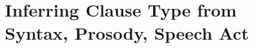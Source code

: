 \documentclass[../main.tex]{subfiles}
\begin{document}
\section{Inferring Clause Type from Syntax, Prosody, Speech Act}

\begin{comment}
\begin{minipage}[t]{0.5\linewidth}
\begin{figure}[H]
\begin{center}
\begin{tikzpicture}
\node[obs] (a) {$A_{i}$};
\node[latent, below=of a] (c) {$C_{i}$};
\node[obs, below=of c, xshift=-0.6cm] (s) {$\vec{S_{i}}$};
\node[obs, below=of c, xshift=0.6cm] (l) {$L_{i}$};
\node[latent, right=of c] (phi) {$\phi^{a}$};
\node[obs, right=of phi] (beta) {$\beta$};

\edge {phi, a}{c};
\edge {c}{s};
\edge {beta}{phi};
\edge {c}{l};


\plate {avalue}{(phi)}{$A$};
\plate {fvalue}{(s)}{$F$};
\plate {nutt}{(a)(c)(s)(l)(fvalue)}{$N$};
\end{tikzpicture}
\end{center}
\caption{Hierarchical model}\label{fg:model}
\end{figure}

\end{minipage}
\begin{minipage}[t]{0.45\linewidth}	
Variables:
\begin{itemize}
\item A: Speech Act: Assertion, Question, Request/Command, other\\
$ a \sim \mbox{Multinomial}(\vec{\theta})$;\\
$\vec{\theta} \sim \mbox{Dir}(\alpha)$
\item C: Clause Type, three values: declarative, interrogative, imperative\\
$ c \sim \mbox{Multinomial}(\vec{\phi^{a}})$;\\
$\vec{\phi^{a}} \sim \mbox{Dir}(\beta)$
\item $\vec{S}$: Syntactic features, feature bundle\\
the value of each feature $F$ is $S^{(F)}$ \\
$s^{(F)} \sim \mbox{Bernoulli}(\delta^{c})$ \\
$\delta\sim \mbox{Beta}(\gamma)$
\end{itemize}
\end{minipage}


\end{comment}
\end{document}
